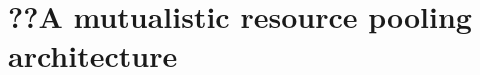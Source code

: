 \chapter{??A mutualistic resource pooling architecture}
\label{sec:malawi}

\renewcommand{\locfolder}{\chapfolder/malawi}



%

%
